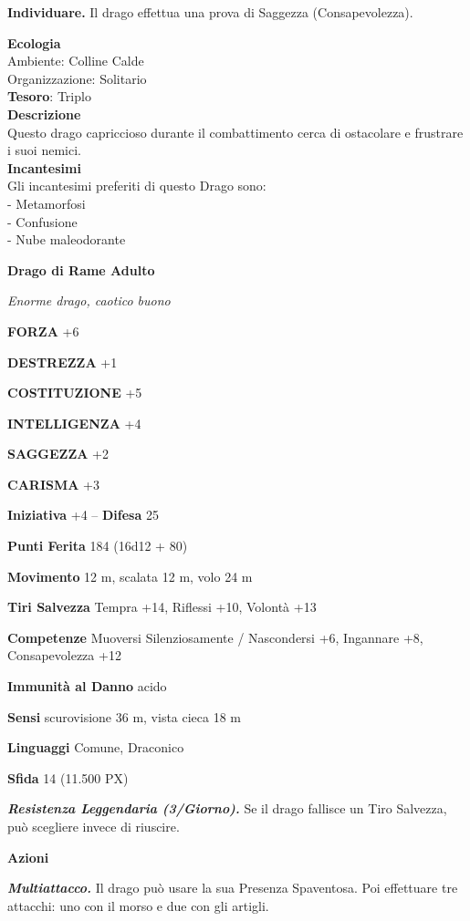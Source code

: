 \begin{multicols}{2}
\textbf{Individuare.} Il drago effettua una prova di Saggezza (Consapevolezza).

\textbf{Ecologia}\\
Ambiente: Colline Calde\\
Organizzazione: Solitario\\
\textbf{Tesoro}: Triplo\\
\textbf{Descrizione}\\
Questo drago capriccioso durante il combattimento cerca di ostacolare e frustrare i suoi nemici.\\
\textbf{Incantesimi}\\
Gli incantesimi preferiti di questo Drago sono:\\
- Metamorfosi\\
- Confusione\\
- Nube maleodorante


\medskip{}\textbf{Drago di Rame Adulto}

\textit{Enorme drago, caotico buono}

\textbf{FORZA} +6

\textbf{DESTREZZA} +1

\textbf{COSTITUZIONE} +5

\textbf{INTELLIGENZA} +4

\textbf{SAGGEZZA} +2

\textbf{CARISMA} +3

\textbf{Iniziativa} +4 -- \textbf{Difesa} 25

\textbf{Punti Ferita} 184 (16d12 + 80)

\textbf{Movimento} 12 m, scalata 12 m, volo 24 m

\textbf{Tiri Salvezza} Tempra +14, Riflessi +10, Volontà +13

\textbf{Competenze} Muoversi Silenziosamente / Nascondersi +6, Ingannare +8, Consapevolezza +12

\textbf{Immunità al Danno} acido

\textbf{Sensi} scurovisione 36 m, vista cieca 18 m

\textbf{Linguaggi} Comune, Draconico

\textbf{Sfida} 14 (11.500 PX)

\textit{\textbf{Resistenza Leggendaria (3/Giorno).}} Se il drago fallisce un Tiro Salvezza, può scegliere invece di riuscire.

\textbf{Azioni}

\textit{\textbf{Multiattacco.}} Il drago può usare la sua Presenza Spaventosa. Poi effettuare tre attacchi: uno con il morso e due con gli artigli.


\end{multicols}
